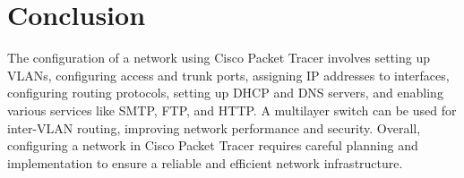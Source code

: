\documentclass[12pt]{article}
\begin{document}
\section{Conclusion}
The configuration of a network using Cisco Packet Tracer involves setting up VLANs, configuring access and trunk ports, assigning IP addresses to interfaces, configuring routing protocols, setting up DHCP and DNS servers, and enabling various services like SMTP, FTP, and HTTP. A multilayer switch can be used for inter-VLAN routing, improving network performance and security. Overall, configuring a network in Cisco Packet Tracer requires careful planning and implementation to ensure a reliable and efficient network infrastructure.
\end{document}
